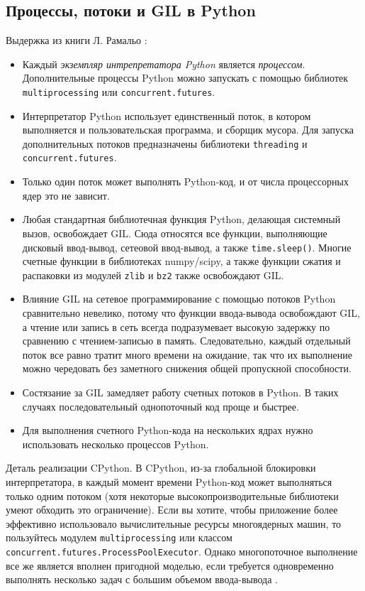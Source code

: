 \documentclass[%
	11pt,
	a4paper,
	utf8,
		]{article}
\begin{document}
\subsection{Процессы, потоки и GIL в Python}

Выдержка из книги Л. Рамальо \cite[]{ramalho:python-2022}:
\begin{itemize}
	\item Каждый \emph{экземпляр интрепретатора Python} является \emph{процессом}. Дополнительные процессы Python можно запускать с помощью библиотек \texttt{multiprocessing} или \texttt{concurrent.futures}. 
	
	\item Интерпретатор Python использует единственный поток, в котором выполняется и пользовательская программа, и сборщик мусора. Для запуска дополнительных потоков предназначены библиотеки \texttt{threading} и \texttt{concurrent.futures}.
	
	\item Только один поток может выполнять Python-код, и от числа процессорных ядер это не зависит.
	
	\item Любая стандартная библиотечная функция Python, делающая системный вызов, освобождает GIL. Сюда относятся все функции, выполняющие дисковый ввод-вывод, сетеовой ввод-вывод, а также \texttt{time.sleep()}. Многие счетные функции в библиотеках numpy/scipy, а также функции сжатия и распаковки из модулей \texttt{zlib} и \texttt{bz2} также освобождают GIL.
	
	\item Влияние GIL на сетевое программирование с помощью потоков Python сравнительно невелико, потому что функции ввода-вывода освобождают GIL, а чтение или запись в сеть всегда подразумевает высокую задержку по сравнению с чтением-записью в память. Следовательно, каждый отдельный поток все равно тратит много времени на ожидание, так что их выполнение можно чередовать без заметного снижения общей пропускной способности.
	
	\item Состязание за GIL замедляет работу счетных потоков в Python. В таких случаях последовательный однопоточный код проще и быстрее.
	
	\item Для выполнения счетного Python-кода на нескольких ядрах нужно использовать несколько процессов Python.
\end{itemize}

Деталь реализации CPython. В CPython, из-за глобальной блокировки интерпретатора, в каждый момент времени Python-код может выполняться только одним потоком (хотя некоторые высокопроизводительные библиотеки умеют обходить это ограничение). Если вы хотите, чтобы приложение более эффективно использовало вычислительные ресурсы многоядерных машин, то пользуйтесь модулем \texttt{multiprocessing} или классом \texttt{concurrent.futures.ProcessPoolExecutor}. Однако многопоточное выполнение все же является вполнен пригодной моделью, если требуется одновременно выполнять несколько задач с большим объемом ввода-вывода \cite[]{ramalho:python-2022}.
\end{document}
